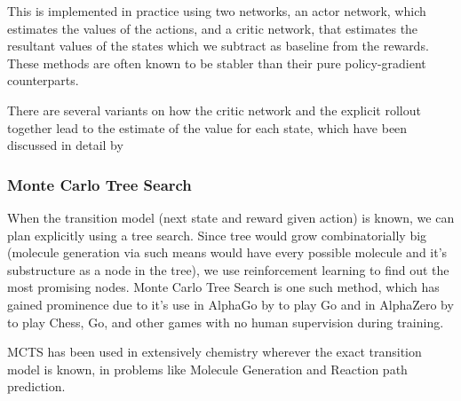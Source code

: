 This is implemented in practice using two networks, an actor network, which estimates the values of the actions, and a critic network, that estimates the resultant values of the states which we subtract as baseline from the rewards. These methods are often known to be stabler than their pure policy-gradient counterparts.

There are several variants on how the critic network and the explicit rollout together lead to the estimate of the value for each state, which have been discussed in detail by \cite{actor-critic-a2c, actor-critic-a3c, actor-critic-gae}

\subsubsection{Monte Carlo Tree Search}

When the transition model (next state and reward given action) is known, we can plan explicitly using a tree search. Since tree would grow combinatorially big (molecule generation via such means would have every possible molecule and it's substructure as a node in the tree), we use reinforcement learning to find out the most promising nodes. Monte Carlo Tree Search is one such method, which has gained prominence due to it's use in AlphaGo by \cite{mcts-alphago} to play Go and in AlphaZero by \cite{mcts-alphazero} to play Chess, Go, and other games with no human supervision during training. 

MCTS has been used in extensively chemistry wherever the exact transition model is known, in problems like Molecule Generation and Reaction path prediction. 





